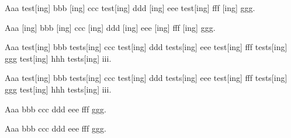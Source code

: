 \documentclass{article}
\begin{document}
Aaa \Acrshort{test}[ing] bbb [ing] ccc \Acrlong{test}[ing] ddd
[ing] eee \Acrfull{test}[ing] fff [ing] ggg.

Aaa [ing] bbb [ing] ccc [ing] ddd
[ing] eee [ing] fff [ing] ggg.



Aaa \acs{test}[ing] bbb \acsp{test}[ing] ccc \acl{test}[ing] ddd
\aclp{test}[ing] eee \acf{test}[ing] fff \acfp{test}[ing] ggg \ac{test}[ing]
hhh \acp{test}[ing] iii.

Aaa \Acs{test}[ing] bbb \Acsp{test}[ing] ccc \Acl{test}[ing] ddd
\Aclp{test}[ing] eee \Acf{test}[ing] fff \Acfp{test}[ing] ggg \Ac{test}[ing]
hhh \Acp{test}[ing] iii.



Aaa  bbb  ccc  ddd
 eee  fff  ggg.

Aaa  bbb  ccc  ddd
 eee  fff  ggg.
\end{document}
